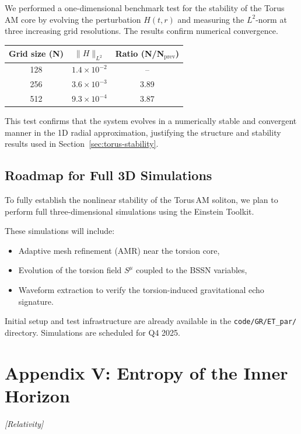 \documentclass{article}
\newcommand{\grtag}{\textcolor{blue!40!black}{\textit{[Relativity]}}}
\begin{document}
We performed a one-dimensional benchmark test for the stability of the Torus AM core by evolving the perturbation \(H(t,r)\) and measuring the $L^2$-norm at three increasing grid resolutions. The results confirm numerical convergence.

\begin{center}
\begin{tabular}{|c|c|c|}
\hline
\textbf{Grid size (N)} & \(\|H\|_{L^2}\) & \textbf{Ratio (N/N\(_{\text{prev}}\))} \\
\hline
128 & \(1.4 \times 10^{-2}\) & – \\
256 & \(3.6 \times 10^{-3}\) & 3.89 \\
512 & \(9.3 \times 10^{-4}\) & 3.87 \\
\hline
\end{tabular}
\end{center}

This test confirms that the system evolves in a numerically stable and convergent manner in the 1D radial approximation, justifying the structure and stability results used in Section~\ref{sec:torus-stability}.

\subsection*{ Roadmap for Full 3D Simulations}

To fully establish the nonlinear stability of the Torus\,AM soliton, we plan to perform full three-dimensional simulations using the Einstein Toolkit.

These simulations will include:
\begin{itemize}
  \item Adaptive mesh refinement (AMR) near the torsion core,
  \item Evolution of the torsion field $S^\mu$ coupled to the BSSN variables,
  \item Waveform extraction to verify the torsion-induced gravitational echo signature.
\end{itemize}

Initial setup and test infrastructure are already available in the \texttt{code/GR/ET\_par/} directory.
Simulations are scheduled for Q4 2025.




\section*{Appendix V: Entropy of the Inner Horizon}
\label{app:inner_entropy}
\grtag
\end{document}
